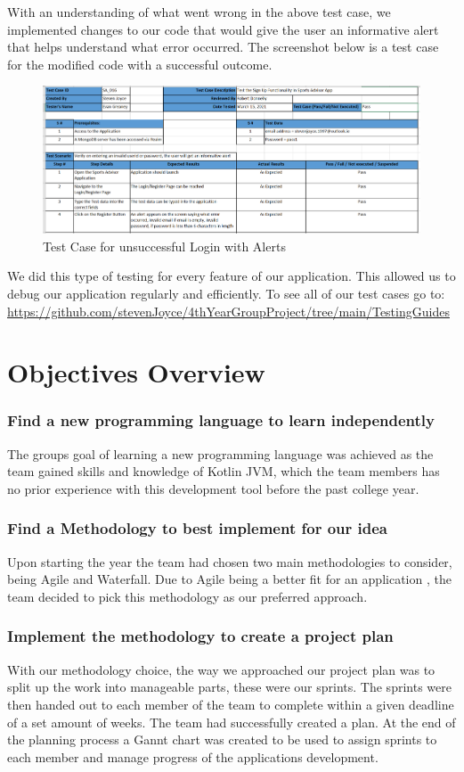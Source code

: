 With an understanding of what went wrong in the above test case, we implemented changes to our code that would give the user an informative alert that helps understand what error occurred. The screenshot below is a test case for the modified code with a successful outcome.
\begin{figure}[H]
    \centering
    \includegraphics[width=15cm, height = 6.5 cm]{img/testCaseSignInError.PNG}
    \caption{Test Case for unsuccessful Login with Alerts}
    \label{fig:altas config}
\end{figure}

We did this type of testing for every feature of our application. This allowed us to debug our application regularly and efficiently. To see all of our test cases go to: \url{https://github.com/stevenJoyce/4thYearGroupProject/tree/main/TestingGuides}
\section{Objectives Overview}
\subsubsection{Find a new programming language to learn independently}
The groups goal of learning a new programming language was achieved as the team gained skills and knowledge of Kotlin JVM, which the team members has no prior experience with this development tool before the past college year.
\subsubsection {Find a Methodology to best implement for our idea}
Upon starting the year the team had chosen two main methodologies to consider, being Agile and Waterfall. Due to Agile being a better fit for an application , the team decided to pick this methodology as our preferred approach.
\subsubsection {Implement the methodology to create a project plan}
With our methodology choice, the way we approached our project plan was to split up the work into manageable parts, these were our sprints. The sprints were then handed out to each member of the team to complete within a given deadline of a set amount of weeks. The team had successfully created a plan. At the end of the planning process a Gannt chart was created to be used to assign sprints to each member and manage progress of the applications development.
